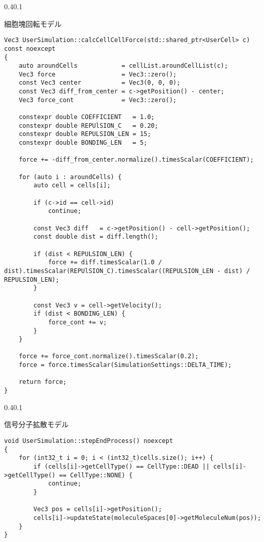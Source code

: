 \documentclass[vipdfmx,a4paper,11pt]{jsarticle}
\makeatletter
\renewcommand{\subsection}{%
  \@startsection{subsection}{1}{\z@}%
  {0.4\Cvs}{0.1\Cvs}%
  {\normalfont\large\headfont\raggedright}}
\renewcommand{\subsubsection}{%
  \@startsection{subsubsection}{1}{\z@}%
  {0.4\Cvs}{0.1\Cvs}%
  {\normalfont\large\headfont\raggedright}}
\makeatother
\begin{document}
\subsubsection{細胞塊回転モデル}
\begin{lstlisting}[caption=calcCellCellForce()]
Vec3 UserSimulation::calcCellCellForce(std::shared_ptr<UserCell> c) const noexcept
{
    auto aroundCells            = cellList.aroundCellList(c);
    Vec3 force                  = Vec3::zero();
    const Vec3 center           = Vec3(0, 0, 0);
    const Vec3 diff_from_center = c->getPosition() - center;
    Vec3 force_cont             = Vec3::zero();

    constexpr double COEFFICIENT   = 1.0;
    constexpr double REPUlSION_C   = 0.20;
    constexpr double REPULSION_LEN = 15;
    constexpr double BONDING_LEN   = 5;

    force += -diff_from_center.normalize().timesScalar(COEFFICIENT);

    for (auto i : aroundCells) {
        auto cell = cells[i];

        if (c->id == cell->id)
            continue;

        const Vec3 diff   = c->getPosition() - cell->getPosition();
        const double dist = diff.length();

        if (dist < REPULSION_LEN) {
            force += diff.timesScalar(1.0 / dist).timesScalar(REPUlSION_C).timesScalar((REPULSION_LEN - dist) / REPULSION_LEN);
        }

        const Vec3 v = cell->getVelocity();
        if (dist < BONDING_LEN) {
            force_cont += v;
        }
    }

    force += force_cont.normalize().timesScalar(0.2);
    force = force.timesScalar(SimulationSettings::DELTA_TIME);

    return force;
}
\end{lstlisting}

\subsection{信号分子拡散モデル}
\begin{lstlisting}[caption=stepEndProcess()]
void UserSimulation::stepEndProcess() noexcept
{
    for (int32_t i = 0; i < (int32_t)cells.size(); i++) {
        if (cells[i]->getCellType() == CellType::DEAD || cells[i]->getCellType() == CellType::NONE) {
            continue;
        }

        Vec3 pos = cells[i]->getPosition();
        cells[i]->updateState(moleculeSpaces[0]->getMoleculeNum(pos));
    }
}
\end{lstlisting}
\end{document}
